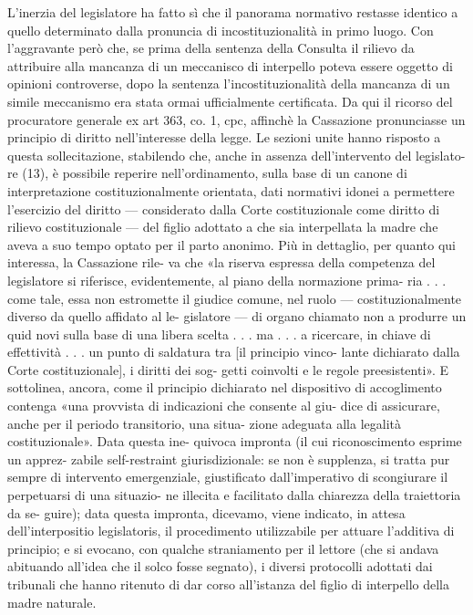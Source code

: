 L'inerzia del legislatore ha fatto sì che il panorama normativo restasse identico a quello determinato dalla pronuncia di incostituzionalità in primo luogo. Con l'aggravante però che, se prima della sentenza della Consulta il rilievo da attribuire alla mancanza di un meccanisco di interpello poteva essere oggetto di opinioni controverse, dopo la sentenza l'incostituzionalità della mancanza di un simile meccanismo era stata ormai ufficialmente certificata. Da qui il ricorso del procuratore generale ex art 363, co. 1, cpc, affinchè la Cassazione pronunciasse un principio di diritto nell'interesse della legge.
Le  sezioni  unite  hanno  risposto  a  questa  sollecitazione, 
stabilendo che, anche in assenza dell’intervento del legislato-
re  (13),  è  possibile  reperire  nell’ordinamento,  sulla  base  di 
un  canone  di  interpretazione  costituzionalmente  orientata, 
dati  normativi  idonei  a  permettere  l’esercizio  del  diritto  — 
considerato  dalla  Corte  costituzionale  come  diritto  di  rilievo 
costituzionale  —  del  figlio  adottato  a  che  sia  interpellata  la 
madre  che  aveva  a  suo  tempo  optato  per  il  parto  anonimo. 
Più in dettaglio, per quanto qui interessa, la Cassazione rile-
va  che  «la  riserva  espressa  della  competenza  del  legislatore 
si riferisce, evidentemente, al piano della normazione prima-
ria . . . come tale, essa non estromette il giudice comune, nel 
ruolo  —  costituzionalmente  diverso  da  quello  affidato  al  le-
gislatore — di organo chiamato non a produrre un quid novi 
sulla base di una libera scelta . . . ma . . . a ricercare, in chiave 
di effettività . . . un punto di saldatura tra [il principio vinco-
lante  dichiarato  dalla  Corte  costituzionale],  i  diritti  dei  sog-
getti  coinvolti  e  le  regole  preesistenti».  E  sottolinea,  ancora, 
come  il  principio  dichiarato  nel  dispositivo  di  accoglimento 
contenga  «una  provvista  di  indicazioni  che  consente  al  giu-
dice di assicurare, anche per il periodo transitorio, una situa-
zione adeguata alla legalità costituzionale». Data questa ine-
quivoca  impronta  (il  cui  riconoscimento  esprime  un  apprez-
zabile  self-restraint  giurisdizionale:  se  non  è  supplenza,  si 
tratta  pur  sempre  di  intervento  emergenziale,  giustificato 
dall’imperativo  di  scongiurare  il  perpetuarsi  di  una  situazio-
ne  illecita  e  facilitato  dalla  chiarezza  della  traiettoria  da  se-
guire); data questa impronta, dicevamo, viene indicato, in attesa dell’interpositio legislatoris, il procedimento utilizzabile 
per attuare l’additiva di principio; e si evocano, con qualche 
straniamento  per  il  lettore  (che  si  andava  abituando  all’idea 
che  il  solco  fosse  segnato),  i  diversi  protocolli  adottati  dai 
tribunali che hanno ritenuto di dar corso all’istanza del figlio 
di interpello della madre naturale. 

